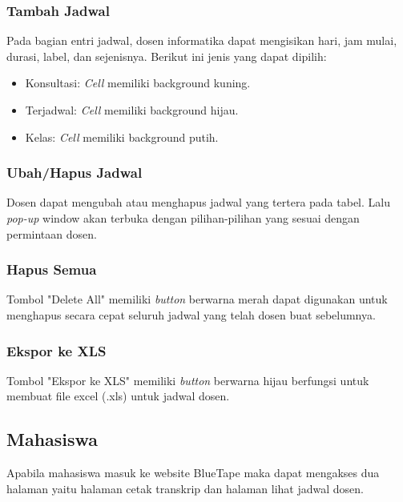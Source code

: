 \subsubsection{Tambah Jadwal}
Pada bagian entri jadwal, dosen informatika dapat mengisikan hari, jam mulai, durasi, label, dan sejenisnya. Berikut ini jenis yang dapat dipilih:
\begin{itemize}
	\item Konsultasi: \textit{Cell} memiliki background kuning.
	\item Terjadwal: \textit{Cell} memiliki background hijau.
	\item Kelas: \textit{Cell} memiliki background putih.
\end{itemize}

\subsubsection{Ubah/Hapus Jadwal}
Dosen dapat mengubah atau menghapus jadwal yang tertera pada tabel. Lalu \textit{pop-up} window akan terbuka dengan pilihan-pilihan yang sesuai dengan permintaan dosen.

\subsubsection{Hapus Semua}
Tombol "Delete All" memiliki \textit{button} berwarna merah dapat digunakan untuk menghapus secara cepat seluruh jadwal yang telah dosen buat sebelumnya.

\subsubsection{Ekspor ke XLS}
Tombol "Ekspor ke XLS" memiliki \textit{button} berwarna hijau berfungsi untuk membuat file excel (.xls) untuk jadwal dosen.

\subsection{Mahasiswa}
Apabila mahasiswa masuk ke website BlueTape maka dapat mengakses dua halaman yaitu halaman cetak transkrip dan halaman lihat jadwal dosen.
